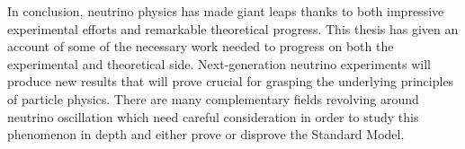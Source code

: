 In conclusion, neutrino physics has made giant leaps thanks to both impressive experimental efforts %
and remarkable theoretical progress.
This thesis has given an account of some of the necessary work needed to progress on both %
the experimental and theoretical side.
Next-generation neutrino experiments will produce new results that will prove crucial for grasping the underlying %
principles of particle physics.
There are many complementary fields revolving around neutrino oscillation %
which need careful consideration in order to study this phenomenon in depth and either prove or disprove the Standard Model.
